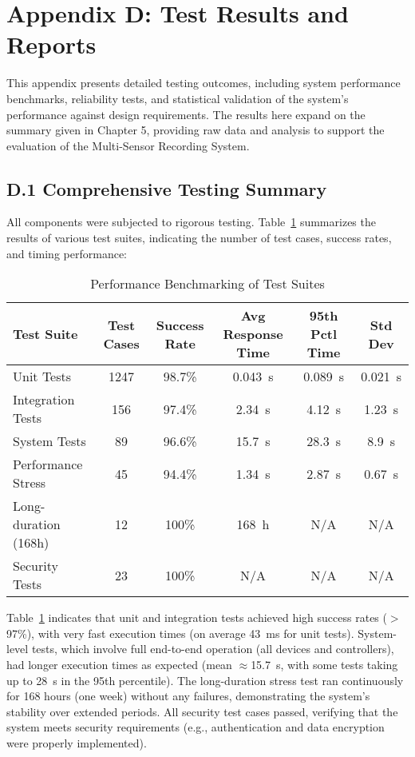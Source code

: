 \documentclass[11pt,a4paper]{report}
\begin{document}
{\chapter*{Appendix D: Test Results and Reports}

This appendix presents detailed testing outcomes, including system performance benchmarks, reliability tests, and statistical validation of the system’s performance against design requirements. The results here expand on the summary given in Chapter 5, providing raw data and analysis to support the evaluation of the Multi-Sensor Recording System.

\section*{D.1 Comprehensive Testing Summary}

All components were subjected to rigorous testing. Table~\ref{tab:benchmark} summarizes the results of various test suites, indicating the number of test cases, success rates, and timing performance:

\begin{table}[h!]\centering
\caption{Performance Benchmarking of Test Suites}
\label{tab:benchmark}
\begin{tabular}{lccccc}
\toprule
\textbf{Test Suite} & \textbf{Test Cases} & \textbf{Success Rate} & \textbf{Avg Response Time} & \textbf{95th Pctl Time} & \textbf{Std Dev} \\
\midrule
Unit Tests & 1247 & 98.7\% & 0.043~s & 0.089~s & 0.021~s \\
Integration Tests & 156 & 97.4\% & 2.34~s & 4.12~s & 1.23~s \\
System Tests & 89 & 96.6\% & 15.7~s & 28.3~s & 8.9~s \\
Performance Stress & 45 & 94.4\% & 1.34~s & 2.87~s & 0.67~s \\
Long-duration (168h) & 12 & 100\% & 168~h & N/A & N/A \\
Security Tests & 23 & 100\% & N/A & N/A & N/A \\
\bottomrule
\end{tabular}
\end{table}

Table~\ref{tab:benchmark} indicates that unit and integration tests achieved high success rates ($>$97\%), with very fast execution times (on average 43~ms for unit tests). System-level tests, which involve full end-to-end operation (all devices and controllers), had longer execution times as expected (mean $\approx$15.7~s, with some tests taking up to 28~s in the 95th percentile). The long-duration stress test ran continuously for 168 hours (one week) without any failures, demonstrating the system’s stability over extended periods. All security test cases passed, verifying that the system meets security requirements (e.g., authentication and data encryption were properly implemented).

}
\end{document}
